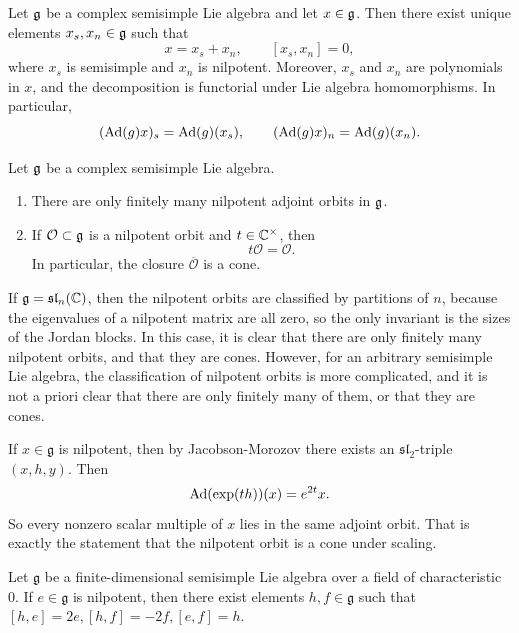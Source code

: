 \documentclass[12pt]{article}
\begin{document}
\begin{theorem}
    Let $\mathfrak{g}$ be a complex semisimple Lie algebra and let $x\in \mathfrak{g}$. Then there exist unique elements $x_s,x_n\in \mathfrak{g}$ such that
    \[
        x=x_s+x_n,\qquad [x_s,x_n]=0,
    \]
    where $x_s$ is semisimple and $x_n$ is nilpotent. Moreover, $x_s$ and $x_n$ are polynomials in $x$, and the decomposition is functorial under Lie algebra homomorphisms. In particular,
    \[
        (\operatorname{Ad}(g)x)_s=\operatorname{Ad}(g)(x_s),\qquad (\operatorname{Ad}(g)x)_n=\operatorname{Ad}(g)(x_n).
    \]
\end{theorem}

\begin{theorem}
    Let $\mathfrak{g}$ be a complex semisimple Lie algebra.
    \begin{enumerate}
        \item There are only finitely many nilpotent adjoint orbits in $\mathfrak{g}$.
        \item If $\mathcal O\subset \mathfrak{g}$ is a nilpotent orbit and $t\in \mathbb{C}^\times$, then
              \[
                  t\mathcal O=\mathcal O.
              \]
              In particular, the closure $\overline{\mathcal O}$ is a cone.
    \end{enumerate}
\end{theorem}

\begin{remark}
    If $\mathfrak{g} = \mathfrak{sl}_n(\mathbb{C})$, then the nilpotent orbits are classified by partitions of $n$, because the eigenvalues of a nilpotent matrix are all zero, so the only invariant is the sizes of the Jordan blocks. In this case, it is clear that there are only finitely many nilpotent orbits, and that they are cones. However, for an arbitrary semisimple Lie algebra, the classification of nilpotent orbits is more complicated, and it is not a priori clear that there are only finitely many of them, or that they are cones.
\end{remark}

\begin{remark}
    If $x\in \mathfrak g$ is nilpotent, then by Jacobson-Morozov there exists an $\mathfrak{sl}_2$-triple $(x,h,y)$. Then
    \[
        \operatorname{Ad}(\exp(th))(x)=e^{2t}x.
    \]
    So every nonzero scalar multiple of $x$ lies in the same adjoint orbit. That is exactly the statement that the nilpotent orbit is a cone under scaling.
\end{remark}
\begin{theorem}
    Let $\mathfrak g$ be a finite-dimensional semisimple Lie algebra over a field of characteristic 0. If $e\in \mathfrak g$ is nilpotent, then there exist elements $h,f\in \mathfrak g$ such that
    $[h,e]=2e, [h,f]=-2f, [e,f]=h$.
\end{theorem}
\end{document}

